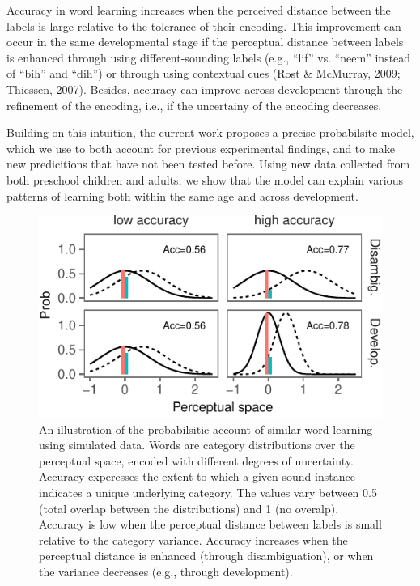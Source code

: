 \documentclass[10pt, letterpaper]{article}
\newenvironment{CodeChunk}{}{}
\begin{document}
Accuracy in word learning increases when the perceived distance between
the labels is large relative to the tolerance of their encoding. This
improvement can occur in the same developmental stage if the perceptual
distance between labels is enhanced through using different-sounding
labels (e.g., ``lif'' vs. ``neem'' instead of ``bih'' and ``dih'') or
through using contextual cues (Rost \& McMurray, 2009; Thiessen, 2007).
Besides, accuracy can improve across development through the refinement
of the encoding, i.e., if the uncertainy of the encoding decreases.

Building on this intuition, the current work proposes a precise
probabilsitc model, which we use to both account for previous
experimental findings, and to make new predicitions that have not been
tested before. Using new data collected from both preschool children and
adults, we show that the model can explain various patterns of learning
both within the same age and across development.

\begin{CodeChunk}
\begin{figure}[H]

{\centering \includegraphics{figs/illus-1} 

}

\caption{\label{fig:illus} An illustration of the probabilsitic account of similar word learning using simulated data. Words are category distributions over the perceptual space, encoded with different degrees of uncertainty. Accuracy experesses the extent to which a given sound instance indicates a unique underlying category. The values vary between 0.5 (total overlap between the distributions) and 1 (no overalp). Accuracy is low when the perceptual distance between labels is small relative to the category variance. Accuracy increases when the perceptual distance is enhanced (through disambiguation), or when the variance decreases (e.g., through development).}\label{fig:illus}
\end{figure}
\end{CodeChunk}
\end{document}
